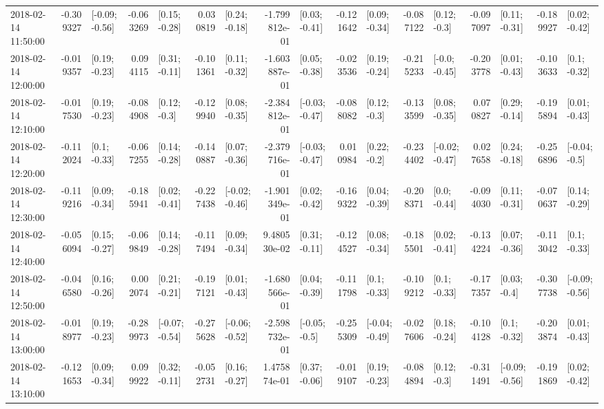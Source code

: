 \begin{tabular}{lrlrlrlrlrlrlrlrl}
2018-02-14 11:50:00 & -0.309327 &  [-0.09; -0.56] & -0.063269 &   [0.15; -0.28] &  0.030819 &   [0.24; -0.18] & -1.799812e-01 &   [0.03; -0.41] & -0.121642 &   [0.09; -0.34] & -0.087122 &    [0.12; -0.3] & -0.097097 &   [0.11; -0.31] & -0.189927 &   [0.02; -0.42] \\
2018-02-14 12:00:00 & -0.019357 &   [0.19; -0.23] &  0.094115 &   [0.31; -0.11] & -0.101361 &   [0.11; -0.32] & -1.603887e-01 &   [0.05; -0.38] & -0.023536 &   [0.19; -0.24] & -0.215233 &   [-0.0; -0.45] & -0.203778 &   [0.01; -0.43] & -0.103633 &    [0.1; -0.32] \\
2018-02-14 12:10:00 & -0.017530 &   [0.19; -0.23] & -0.084908 &    [0.12; -0.3] & -0.129940 &   [0.08; -0.35] & -2.384812e-01 &  [-0.03; -0.47] & -0.088082 &    [0.12; -0.3] & -0.133599 &   [0.08; -0.35] &  0.070827 &   [0.29; -0.14] & -0.195894 &   [0.01; -0.43] \\
2018-02-14 12:20:00 & -0.112024 &    [0.1; -0.33] & -0.067255 &   [0.14; -0.28] & -0.140887 &   [0.07; -0.36] & -2.379716e-01 &  [-0.03; -0.47] &  0.010984 &    [0.22; -0.2] & -0.234402 &  [-0.02; -0.47] &  0.027658 &   [0.24; -0.18] & -0.256896 &   [-0.04; -0.5] \\
2018-02-14 12:30:00 & -0.119216 &   [0.09; -0.34] & -0.185941 &   [0.02; -0.41] & -0.227438 &  [-0.02; -0.46] & -1.901349e-01 &   [0.02; -0.42] & -0.169322 &   [0.04; -0.39] & -0.208371 &    [0.0; -0.44] & -0.094030 &   [0.11; -0.31] & -0.070637 &   [0.14; -0.29] \\
2018-02-14 12:40:00 & -0.056094 &   [0.15; -0.27] & -0.069849 &   [0.14; -0.28] & -0.117494 &   [0.09; -0.34] &  9.480530e-02 &   [0.31; -0.11] & -0.124527 &   [0.08; -0.34] & -0.185501 &   [0.02; -0.41] & -0.134224 &   [0.07; -0.36] & -0.113042 &    [0.1; -0.33] \\
2018-02-14 12:50:00 & -0.046580 &   [0.16; -0.26] &  0.002074 &   [0.21; -0.21] & -0.197121 &   [0.01; -0.43] & -1.680566e-01 &   [0.04; -0.39] & -0.111798 &    [0.1; -0.33] & -0.109212 &    [0.1; -0.33] & -0.177357 &    [0.03; -0.4] & -0.307738 &  [-0.09; -0.56] \\
2018-02-14 13:00:00 & -0.018977 &   [0.19; -0.23] & -0.289973 &  [-0.07; -0.54] & -0.275628 &  [-0.06; -0.52] & -2.598732e-01 &   [-0.05; -0.5] & -0.255309 &  [-0.04; -0.49] & -0.027606 &   [0.18; -0.24] & -0.104128 &    [0.1; -0.32] & -0.203874 &   [0.01; -0.43] \\
2018-02-14 13:10:00 & -0.121653 &   [0.09; -0.34] &  0.099922 &   [0.32; -0.11] & -0.052731 &   [0.16; -0.27] &  1.475874e-01 &   [0.37; -0.06] & -0.019107 &   [0.19; -0.23] & -0.084894 &    [0.12; -0.3] & -0.311491 &  [-0.09; -0.56] & -0.191869 &   [0.02; -0.42] \\

\end{tabular}
